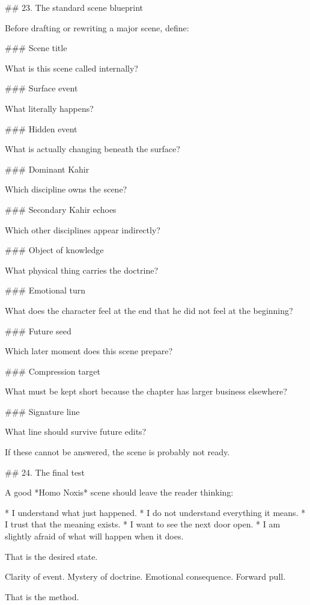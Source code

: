 ## 23. The standard scene blueprint

Before drafting or rewriting a major scene, define:

### Scene title

What is this scene called internally?

### Surface event

What literally happens?

### Hidden event

What is actually changing beneath the surface?

### Dominant Kahir

Which discipline owns the scene?

### Secondary Kahir echoes

Which other disciplines appear indirectly?

### Object of knowledge

What physical thing carries the doctrine?

### Emotional turn

What does the character feel at the end that he did not feel at the beginning?

### Future seed

Which later moment does this scene prepare?

### Compression target

What must be kept short because the chapter has larger business elsewhere?

### Signature line

What line should survive future edits?

If these cannot be answered, the scene is probably not ready.

## 24. The final test

A good *Homo Noxis* scene should leave the reader thinking:

* I understand what just happened.
* I do not understand everything it means.
* I trust that the meaning exists.
* I want to see the next door open.
* I am slightly afraid of what will happen when it does.

That is the desired state.

Clarity of event.
Mystery of doctrine.
Emotional consequence.
Forward pull.

That is the method.
